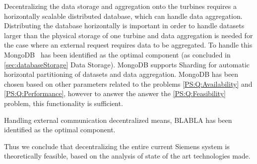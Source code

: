 Decentralizing the data storage and aggregation onto the turbines requires a horizontally scalable distributed database, which can handle data aggregation. Distributing the database horizontally is important in order to handle datasets larger than the physical storage of one turbine and data aggregation is needed for the case where an external request requires data to be aggregated. To handle this MongoDB~\cite{mongodb} has been identified as the optimal component (as concluded in \cref{sec:databaseStorage} Data Storage). MongoDB supports Sharding for automatic horizontal partitioning of datasets and data aggregation. MongoDB has been chosen based on other parameters related to the problems \cref{PS:Q:Availability} and \cref{PS:Q:Performance}, however to answer the answer the \cref{PS:Q:Feasibility} problem, this functionality is sufficient. 

Handling external communication decentralized means, BLABLA has been identified as the optimal component.

Thus we conclude that decentralizing the entire current Siemens system is theoretically feasible, based on the analysis of state of the art technologies made. 
\clearpage